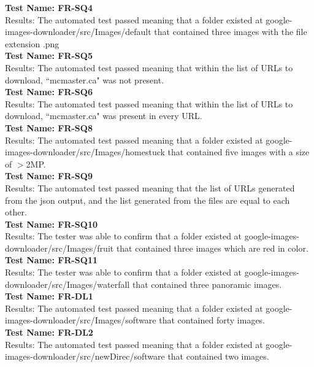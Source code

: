 \documentclass[12pt, titlepage]{article}
\begin{document}
\medskip
\noindent \textbf{Test Name: FR-SQ4}\\
Results: The automated test passed meaning that a folder existed at google-images-downloader/src/Images/default that contained three images with the file extension .png\\

\medskip
\noindent \textbf{Test Name: FR-SQ5}\\
Results: The automated test passed meaning that within the list of URLs to download, ``mcmaster.ca" was not present.\\

\medskip
\noindent \textbf{Test Name: FR-SQ6}\\
Results: The automated test passed meaning that within the list of URLs to download, ``mcmaster.ca" was present in every URL.\\

\medskip
\noindent \textbf{Test Name: FR-SQ8}\\
Results: The automated test passed meaning that a folder existed at google-images-downloader/src/Images/homestuck that contained five images with a size of $>$2MP.\\

\medskip
\noindent \textbf{Test Name: FR-SQ9}\\
Results: The automated test passed meaning that the list of URLs generated from the json output, and the list generated from the files are equal to each other.\\

\medskip
\noindent \textbf{Test Name: FR-SQ10}\\
Results: The tester was able to confirm that a folder existed at google-images-downloader/src/Images/fruit that contained three images which are red in color.\\

\medskip
\noindent \textbf{Test Name: FR-SQ11}\\
Results: The tester was able to confirm that a folder existed at google-images-downloader/src/Images/waterfall that contained three panoramic images.\\

\medskip
\noindent \textbf{Test Name: FR-DL1}\\
Results: The automated test passed meaning that a folder existed at google-images-downloader/src/Images/software that contained forty images.\\

\medskip
\noindent \textbf{Test Name: FR-DL2}\\
Results: The automated test passed meaning that a folder existed at google-images-downloader/src/newDirec/software that contained two images.\\
\end{document}
